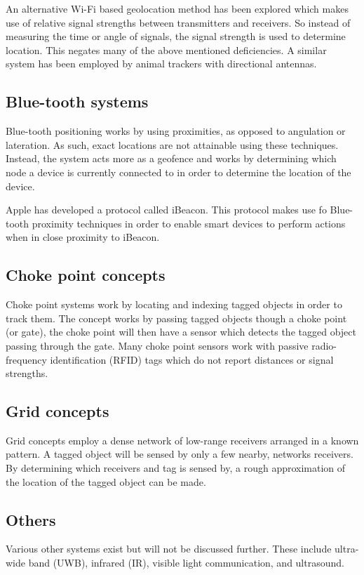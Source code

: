 \documentclass[11pt,a4paper]{report}
\begin{document}
		An alternative Wi-Fi based geolocation method has been explored which makes use of relative signal strengths between transmitters and receivers. So instead of measuring the time or angle of signals, the signal strength is used to determine location. This negates many of the above mentioned deficiencies. A similar system has been employed by animal trackers with directional antennas.
		\cite{yongguang_chen_signal_2002}
	
	\subsection{Blue-tooth systems}
		Blue-tooth positioning works by using proximities, as opposed to angulation or lateration. As such, exact locations are not attainable using these techniques. Instead, the system acts more as a geofence and works by determining which node a device is currently connected to in order to determine the location of the device.
	
		Apple has developed a protocol called iBeacon. This protocol makes use fo Blue-tooth proximity techniques in order to enable smart devices to perform actions when in close proximity to iBeacon.
		\cite{_everything_????}
	
	\subsection{Choke point concepts}
		Choke point systems work by locating and indexing tagged objects in order to track them. The concept works by passing tagged objects though a choke point (or gate), the choke point will then have a sensor which detects the tagged object passing through the gate. Many choke point sensors work with passive radio-frequency identification (RFID) tags which do not report distances or signal strengths.
		\cite{reza_investigation_2008}
	
	\subsection{Grid concepts}
		Grid concepts employ a dense network of low-range receivers arranged in a known pattern. A tagged object will be sensed by only a few nearby, networks receivers. By determining which receivers and tag is sensed by, a rough approximation of the location of the tagged object can be made.
	
	\subsection{Others}
		Various other systems exist but will not be discussed further. These include ultra-wide band (UWB), infrared (IR), visible light communication, and ultrasound.
	
\end{document}
